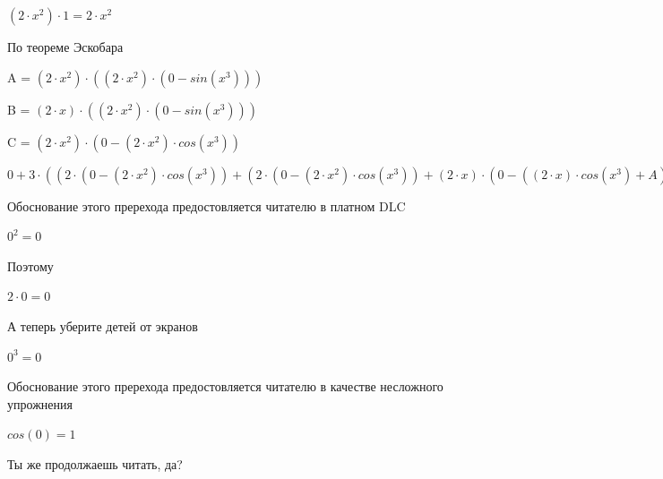 \documentclass[12pt,a4paper,fleqn]{article}
\begin{document}
\begin{center}
$(2 \cdot x^{2}) \cdot 1 = 2 \cdot x^{2}$\end{center}
По теореме Эскобара

\begin{center}
A = $(2 \cdot x^{2}) \cdot ((2 \cdot x^{2}) \cdot (0-sin(x^{3})))$\end{center}
\begin{center}
B = $(2 \cdot x) \cdot ((2 \cdot x^{2}) \cdot (0-sin(x^{3})))$\end{center}
\begin{center}
C = $(2 \cdot x^{2}) \cdot (0-(2 \cdot x^{2}) \cdot cos(x^{3}))$\end{center}
\begin{center}
$0+3 \cdot ((2 \cdot (0-(2 \cdot x^{2}) \cdot cos(x^{3}))+(2 \cdot (0-(2 \cdot x^{2}) \cdot cos(x^{3}))+(2 \cdot x) \cdot (0-((2 \cdot x) \cdot cos(x^{3})+A))))+((2 \cdot (0-(2 \cdot x^{2}) \cdot cos(x^{3}))+(2 \cdot x) \cdot (0-((2 \cdot x) \cdot cos(x^{3})+A)))+((2 \cdot x) \cdot (0-((2 \cdot x) \cdot cos(x^{3})+A))+(2 \cdot x^{2}) \cdot (0-((2 \cdot cos(x^{3})+B)+(B+(2 \cdot x^{2}) \cdot ((2 \cdot x) \cdot (0-sin(x^{3}))+C))))))) = 3 \cdot ((2 \cdot (0-(2 \cdot x^{2}) \cdot cos(x^{3}))+(2 \cdot (0-(2 \cdot x^{2}) \cdot cos(x^{3}))+(2 \cdot x) \cdot (0-((2 \cdot x) \cdot cos(x^{3})+A))))+((2 \cdot (0-(2 \cdot x^{2}) \cdot cos(x^{3}))+(2 \cdot x) \cdot (0-((2 \cdot x) \cdot cos(x^{3})+A)))+((2 \cdot x) \cdot (0-((2 \cdot x) \cdot cos(x^{3})+A))+(2 \cdot x^{2}) \cdot (0-((2 \cdot cos(x^{3})+B)+(B+(2 \cdot x^{2}) \cdot ((2 \cdot x) \cdot (0-sin(x^{3}))+C)))))))$\end{center}
Обоснование этого пререхода предостовляется читателю в платном DLC

\begin{center}$0^{2} = 0$\end{center}
Поэтому

\begin{center}$2 \cdot 0 = 0$\end{center}
А теперь уберите детей от экранов

\begin{center}$0^{3} = 0$\end{center}
Обоснование этого пререхода предостовляется читателю в качестве несложного упрожнения

\begin{center}$cos(0) = 1$\end{center}
Ты же продолжаешь читать, да?
\end{document}
